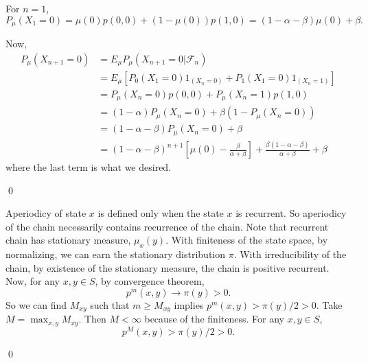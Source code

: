 \begin{problem}[5.6.1] \hfill

	For $n=1$,
	\[
		P_\mu(X_1 = 0) = \mu(0)p(0,0) + (1-\mu(0))p(1, 0) = (1-\alpha-\beta)\mu(0)+\beta.
	\]

	Now,
	\[
		\begin{split}
		P_\mu(X_{n+1} = 0) 
		&= E_\mu P_\mu\left( X_{n+1} = 0 \lvert \mathcal{F}_n \right) \\
		&= E_\mu\left[ P_0\left( X_1 = 0 \right)1_{\left( X_n = 0 \right)} + P_1\left( X_1 = 0 \right)1_{\left( X_n = 1 \right)} \right] \\
		&= P_\mu(X_n = 0)p(0, 0) + P_\mu(X_n = 1)p(1, 0) \\
		&= (1-\alpha)P_\mu(X_n = 0) + \beta(1-P_\mu(X_n = 0)) \\
		&= (1-\alpha-\beta)P_\mu(X_n = 0) + \beta \\
		&= (1-\alpha-\beta)^{n+1}\left[ \mu(0) - \frac{\beta}{\alpha+\beta} \right] + \frac{\beta(1-\alpha-\beta)}{\alpha+\beta} + \beta
	\end{split}
	\]
	where the last term is what we desired.

	\qed
\end{problem}

\begin{problem}[5.6.2] \hfill

	Aperiodicy of state $x$ is defined only when the state $x$ is recurrent.
	So aperiodicy of the chain necessarily contains recurrence of the chain.
	Note that recurrent chain has stationary measure, $\mu_x(y)$.
	With finiteness of the state space, by normalizing, we can earn the stationary distribution $\pi$.
	With irreducibility of the chain, by existence of the stationary measure, the chain is positive recurrent.
	Now, for any $x, y \in S$, by convergence theorem,
	\[
		p^m(x, y) \rightarrow \pi(y) >0.
	\]
	So we can find $M_{xy}$ such that $m \ge M_{xy}$ implies $p^m(x, y) > \pi(y)/2 >0$.
	Take $M = \max_{x,y}M_{xy}$. Then $M<\infty$ because of the finiteness.
	For any $x, y \in S$,
	\[
		p^M(x, y) > \pi(y)/2 >0.
	\]

	\qed
\end{problem}

